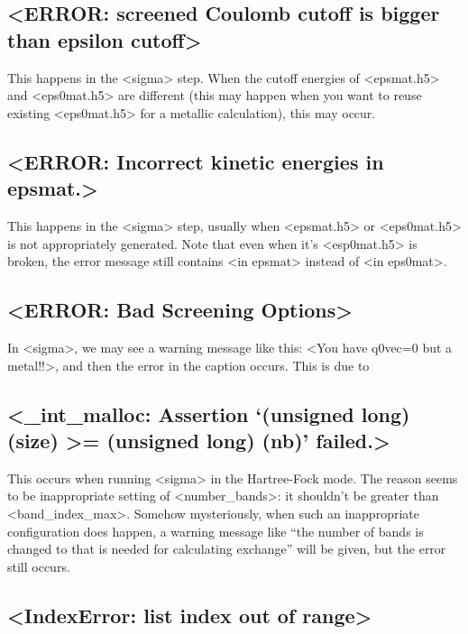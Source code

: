 \documentclass[hyperref, a4paper, 12pt]{report}
\def\texttt#1{<#1>}%
\newcommand{\shortcode}[1]{\texttt{#1}}
\begin{document}
\subsection{\shortcode{ERROR: screened Coulomb cutoff is bigger than epsilon cutoff}}

This happens in the \shortcode{sigma} step.
When the cutoff energies of \shortcode{epsmat.h5} and \shortcode{eps0mat.h5} 
are different 
(this may happen when you want to reuse existing \shortcode{eps0mat.h5} for a metallic calculation),
this may occur. 

\subsection{\shortcode{ERROR: Incorrect kinetic energies in epsmat.}}

This happens in the \shortcode{sigma} step, 
usually when \shortcode{epsmat.h5} or \shortcode{eps0mat.h5} 
is not appropriately generated. 
Note that even when it's \shortcode{esp0mat.h5} is broken, 
the error message still contains \shortcode{in epsmat}
instead of \shortcode{in eps0mat}.

\subsection{\shortcode{ERROR: Bad Screening Options}}

In \shortcode{sigma}, we may see a warning message like this:
\shortcode{You have q0vec=0 but a metal!!},
and then the error in the caption occurs. 
This is due to 

\subsection{\shortcode{_int_malloc: Assertion `(unsigned long) (size) >= (unsigned long) (nb)' failed.}}

This occurs when running \shortcode{sigma} 
in the Hartree-Fock mode.
The reason seems to be inappropriate setting of \shortcode{number_bands}:
it shouldn't be greater than \shortcode{band_index_max}.
Somehow mysteriously,
when such an inappropriate configuration does happen,
a warning message like ``the number of bands is changed to 
that is needed for calculating exchange''
will be given,
but the error still occurs.

\subsection{\shortcode{IndexError: list index out of range}}
\end{document}
